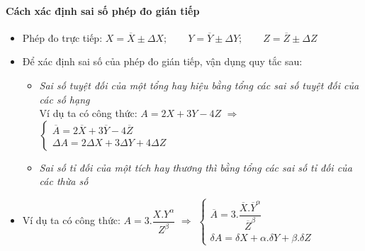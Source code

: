 \paragraph{Cách xác định sai số phép đo gián tiếp}
\begin{itemize}
\item Phép đo trực tiếp: $X=\overline{X}\pm \Delta X;\quad \quad Y=\overline{Y}\pm \Delta Y;\quad \quad Z=\overline{Z}\pm \Delta Z$
\item Để xác định sai số của phép đo gián tiếp, vận dụng quy tắc sau:
\begin{itemize}
\item[$\bullet$] \textit{Sai số tuyệt đối của một tổng hay hiệu bằng tổng các sai số tuyệt đối của các số hạng}\\
Ví dụ ta có công thức: $A=2X + 3Y - 4Z$
$\Rightarrow$ 
$\begin{cases}
 \overline{A}=2\overline{X} + 3\overline{Y} - 4\overline{Z}\\ 
\Delta A=2\Delta X+3\Delta Y+4\Delta Z
\end{cases}$
\item[$\bullet$] \textit{Sai số tỉ đối của một tích hay thương thì bằng tổng các sai số tỉ đối của các thừa số}
\end{itemize}
\item Ví dụ ta có công thức: $A=3.\dfrac{X.Y^\alpha}{Z^\beta}$
$\Rightarrow$ 
$\begin{cases}
\overline{A}=3.\dfrac{\overline{X}.\overline{Y}^\alpha}{\overline{Z}^\beta}\\ 
\delta A=\delta X+\alpha.\delta Y+\beta.\delta Z
\end{cases}$
\end{itemize}
